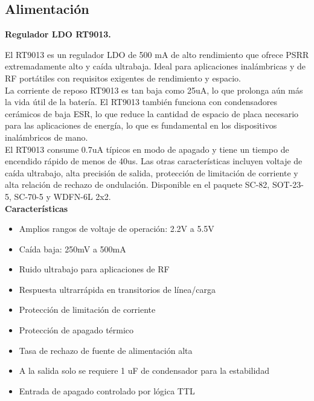 \subsection{Alimentación}

\textbf{Regulador LDO RT9013.}\newline

El RT9013 es un regulador LDO de 500 mA de alto rendimiento que ofrece PSRR extremadamente alto y caída ultrabaja. Ideal para aplicaciones inalámbricas y de RF portátiles con requisitos exigentes de rendimiento y espacio.\\

La corriente de reposo RT9013 es tan baja como 25uA, lo que prolonga aún más la vida útil de la batería. El RT9013 también funciona con condensadores cerámicos de baja ESR, lo que reduce la cantidad de espacio de placa necesario para las aplicaciones de energía, lo que es fundamental en los dispositivos inalámbricos de mano.\\

El RT9013 consume 0.7uA típicos en modo de apagado y tiene un tiempo de encendido rápido de menos de 40us. Las otras características incluyen voltaje de caída ultrabajo, alta precisión de salida, protección de limitación de corriente y alta relación de rechazo de ondulación. Disponible en el paquete SC-82, SOT-23-5, SC-70-5 y WDFN-6L 2x2.\\

\textbf{Características}

\begin{itemize}
    \item Amplios rangos de voltaje de operación: 2.2V a 5.5V
    \item Caída baja: 250mV a 500mA
    \item Ruido ultrabajo para aplicaciones de RF
    \item Respuesta ultrarrápida en transitorios de línea/carga
    \item Protección de limitación de corriente
    \item Protección de apagado térmico
    \item Tasa de rechazo de fuente de alimentación alta
    \item A la salida solo se requiere 1 uF de condensador para la estabilidad
    \item Entrada de apagado controlado por lógica TTL
\end{itemize}

\vspace{1cm}

